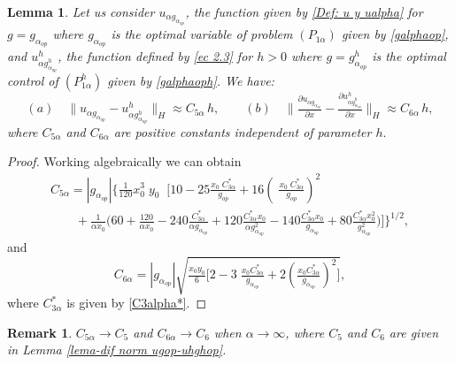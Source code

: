 \documentclass[11pt]{article}
\newcommand\pder[2][]{\ensuremath{\tfrac{\partial#1}{\partial#2}}}
\newtheorem{Lemma}{Lemma}
\newtheorem{Remark}{Remark}
\begin{document}
\begin{Lemma} Let us consider $u_{\alpha g_{\alpha_{op}}}$, the function given by \eqref{Def: u y ualpha} for $g= g_{\alpha_{op}}$ where $g_{\alpha_{op}}$ is the optimal variable of problem $(P_{1\alpha})$ given by \eqref{galphaop}, and ${u^h_{\alpha g^ h_{\alpha_{op}}}}$, the function defined by \eqref{ec 2.3} for $h>0$ where $g={g^h_{\alpha_{op}}}$ is the optimal {control} of {$(P^h_{1\alpha})$} given by
\eqref{galphaoph}. We have: 
  $$   (a) \quad
  \lVert u_{\alpha g_{\alpha_{op}}}- {u^h_{\alpha g^h_{\alpha_{op}}} }   \rVert _H \approx C_{5\alpha}\, h, \qquad
  			        (b) \quad
  \Big\lVert \pder[u_{\alpha g_{\alpha_{op}}}]{x}-\pder[ {u^h_{\alpha g^h_{\alpha_{op}}} }  ]{x}    \Big\rVert _H \approx C_{6\alpha}\, h ,
   $$
 \noindent where  $C_{5\alpha}$ and $C_{6\alpha}$ are positive constants independent of parameter $h.$
   \end{Lemma}  

   \begin{proof}
   Working algebraically we can obtain
   $$\begin{array}{ll}
   C_{5\alpha}= |g_{\alpha_{op}}| \Bigg\lbrace\tfrac{1}{120}x_0^3 \;y_0\;  \;\Big[10-25\tfrac{x_0 \; C_{3\alpha}^*}{g_{op}}+16 \left( \;\tfrac{x_0 \; C_{3\alpha}^*}{g_{op}}\right)^2\\
   \qquad +\tfrac{1}{\alpha x_0}\Big(60+\tfrac{120}{\alpha x_0}-240\tfrac{C_{3\alpha}^*}{\alpha g_{\alpha_{op}}}+120 \tfrac{C_{3\alpha}^* x_0}{\alpha g_{\alpha_{op}}^2}-140 \tfrac{C_{3\alpha}^* x_0}{ g_{\alpha_{op}}}+80 \tfrac{C_{3\alpha}^* x_0^2}{ g_{\alpha_{op}}^2} \Big)\Big]\Bigg\rbrace^{1/2},
   \end{array}$$
   and
   \[C_{6\alpha} = |g_{\alpha_{op}}|\sqrt{ \tfrac{x_0 y_0}{6}   \Big[ 2 -3\;\tfrac{x_0 C_{3\alpha}^*}{g_{\alpha_{op}}}+2 \left(\tfrac{x_0 C_{3\alpha}^*}{g_{\alpha_{op}}}\right)^2 \Big] },\]
      where $C_{3\alpha}^*$ is given by \eqref{C3alpha*}.
   \end{proof}
  \begin{Remark}  $C_{5\alpha}\to C_5$ and $C_{6\alpha}\to C_6$ when $\alpha\to\infty$, where $C_5$ and $C_6$ are given in Lemma \ref{lema-dif norm ugop-uhghop}.
  \end{Remark}
\end{document}
